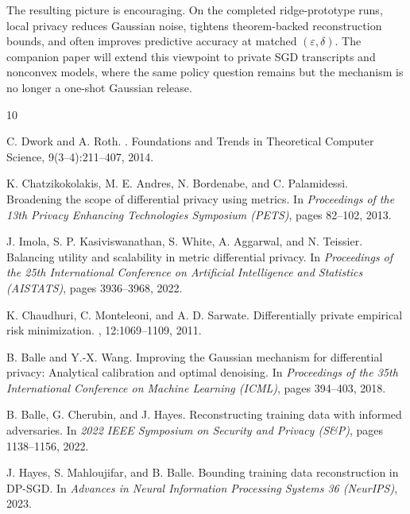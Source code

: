 \documentclass[conference,compsoc]{IEEEtran}
\begin{document}
The resulting picture is encouraging. On the completed ridge-prototype runs, local privacy reduces Gaussian noise, tightens theorem-backed reconstruction bounds, and often improves predictive accuracy at matched $(\varepsilon,\delta)$. The companion paper will extend this viewpoint to private SGD transcripts and nonconvex models, where the same policy question remains but the mechanism is no longer a one-shot Gaussian release.

\begin{thebibliography}{10}

C. Dwork and A. Roth.
.
\newblock Foundations and Trends in Theoretical Computer Science, 9(3--4):211--407, 2014.

K. Chatzikokolakis, M. E. Andres, N. Bordenabe, and C. Palamidessi.
\newblock Broadening the scope of differential privacy using metrics.
\newblock In {\em Proceedings of the 13th Privacy Enhancing Technologies Symposium (PETS)}, pages 82--102, 2013.

J. Imola, S. P. Kasiviswanathan, S. White, A. Aggarwal, and N. Teissier.
\newblock Balancing utility and scalability in metric differential privacy.
\newblock In {\em Proceedings of the 25th International Conference on Artificial Intelligence and Statistics (AISTATS)}, pages 3936--3968, 2022.

K. Chaudhuri, C. Monteleoni, and A. D. Sarwate.
\newblock Differentially private empirical risk minimization.
, 12:1069--1109, 2011.

B. Balle and Y.-X. Wang.
\newblock Improving the Gaussian mechanism for differential privacy: Analytical calibration and optimal denoising.
\newblock In {\em Proceedings of the 35th International Conference on Machine Learning (ICML)}, pages 394--403, 2018.

B. Balle, G. Cherubin, and J. Hayes.
\newblock Reconstructing training data with informed adversaries.
\newblock In {\em 2022 IEEE Symposium on Security and Privacy (S\&P)}, pages 1138--1156, 2022.

J. Hayes, S. Mahloujifar, and B. Balle.
\newblock Bounding training data reconstruction in {DP-SGD}.
\newblock In {\em Advances in Neural Information Processing Systems 36 (NeurIPS)}, 2023.


\end{thebibliography}
\end{document}
